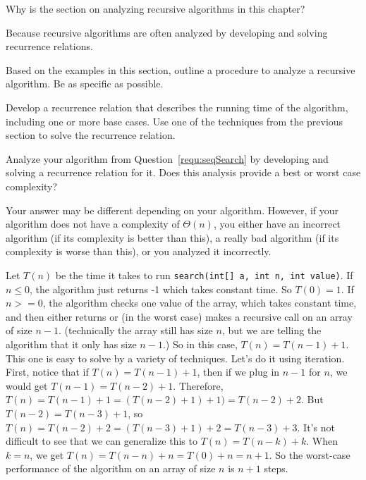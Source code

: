 \begin{requ}
Why is the section on analyzing recursive algorithms in this chapter?
\begin{requanswer}
Because recursive algorithms are often analyzed by developing and solving recurrence relations.
\end{requanswer}
\end{requ}

\begin{requ}
Based on the examples in this section, outline a procedure to analyze a recursive algorithm. Be as specific as possible.
\begin{requanswer}
Develop a recurrence relation that describes the running time of the algorithm, including one or more base cases.
Use one of the techniques from the previous section to solve the recurrence relation.
\end{requanswer}
\end{requ}

\begin{requ}
Analyze your algorithm from Question~\ref{requ:seqSearch}
by developing and solving a recurrence relation for it.
Does this analysis provide a best or worst case complexity?
\begin{requanswer}
Your answer may be different depending on your algorithm.
However, if your algorithm does not have a complexity of $\Theta(n)$, 
you either have an incorrect algorithm (if its complexity is better than this),
a really bad algorithm (if its complexity is worse than this), or you analyzed it incorrectly.

Let $T(n)$ be the time it takes to run \verb+search(int[] a, int n, int value)+.
If $n\leq 0$, the algorithm just returns -1 which takes constant time. So $T(0)=1$.
If $n>=0$, the algorithm checks one value of the array, which takes constant time,
and then either returns or (in the worst case) makes a recursive call on an array of size $n-1$.
(technically the array still has size $n$, but we are telling the algorithm that it only has size $n-1$.)
So in this case, $T(n)=T(n-1)+1$.
This one is easy to solve by a variety of techniques. Let's do it using iteration.
First, notice that if $T(n)=T(n-1)+1$, then if we plug in $n-1$ for $n$, we would get $T(n-1)=T(n-2)+1$.
Therefore, $T(n)=T(n-1)+1=(T(n-2)+1) + 1)= T(n-2)+2$. 
But $T(n-2)=T(n-3)+1$, so $T(n)=T(n-2)+2=(T(n-3)+1)+2=T(n-3)+3$.
It's not difficult to see that we can generalize this to $T(n)=T(n-k)+k$.
When $k=n$, we get $T(n)=T(n-n)+n= T(0)+n = n+1$.
So the worst-case performance of the algorithm on an array of size $n$ is $n+1$ steps.
\end{requanswer}
\end{requ}
